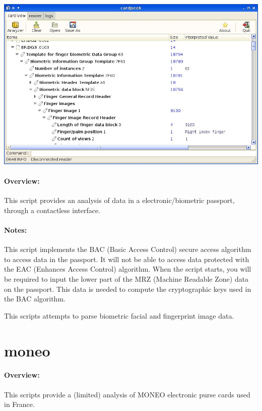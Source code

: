 \documentclass[11pt]{report}
\begin{document}
\begin{center}
\includegraphics[width=1\textwidth]{graphics/sample-epassport.jpg}
\end{center}

\paragraph{Overview:}
This script provides an analysis of data in a electronic/biometric passport, through a contactless interface.

\paragraph{Notes:}
This script implements the BAC (Basic Access Control) secure access algorithm to access data in the passport. 
It will not be able to access data protected with the EAC (Enhances Access Control) algorithm.
When the script starts, you will be required to input the lower part of the MRZ (Machine Readable Zone) data on the passport. 
This data is needed to compute the cryptographic keys used in the BAC algorithm.

This scripts attempts to parse biometric facial and fingerprint image data.

\section{moneo}

\paragraph{Overview:}
This scripts provide a (limited) analysis of MONEO electronic purse cards used in France.
\end{document}
